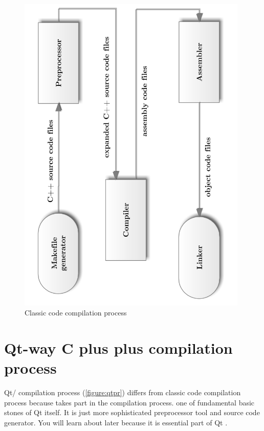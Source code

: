 \begin{figure}[ht]
\centering
\includegraphics[angle=-90,width=11cm]{graphics/laboratory/09-classiccomp.pdf}
\caption{Classic \cpp{} code compilation process}\label{figure:classicpr}
\end{figure}

\section{Qt-way C plus plus compilation process}
Qt/\cpp{} compilation process (\autoref{figure:qtpr}) differs from classic \cpp{} code compilation process because  takes part in the compilation process.  one of fundamental basic stones of Qt itself. It is just more sophisticated preprocessor tool and source code generator. You will learn about  later because it is essential part of Qt .

